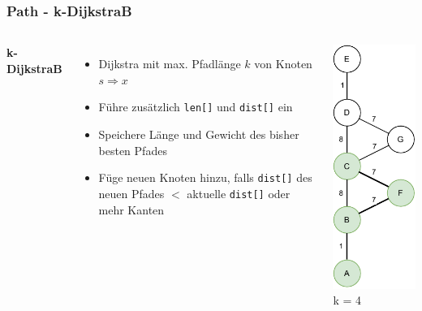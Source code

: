 \documentclass[aspectratio=169]{beamer}
\begin{document}

\begin{frame}
	\frametitle{Path - k-DijkstraB}
	\begin{columns}[c] %
		
		\textbf{k-DijkstraB}
		\begin{itemize}
			\item Dijkstra mit max. Pfadlänge $k$ von Knoten $s \Rightarrow x$
			\item Führe zusätzlich \texttt{len[]} und \texttt{dist[]} ein
			\item Speichere Länge und Gewicht des bisher besten Pfades
			\item Füge neuen Knoten hinzu, falls \texttt{dist[]} des neuen Pfades $<$ aktuelle \texttt{dist[]} oder mehr Kanten
		\end{itemize}
		\includegraphics[scale=.6]{path_dijkstraAB.pdf}
		k = 4\\

		
		
	\end{columns}
	\end{frame}
	
\end{document}
